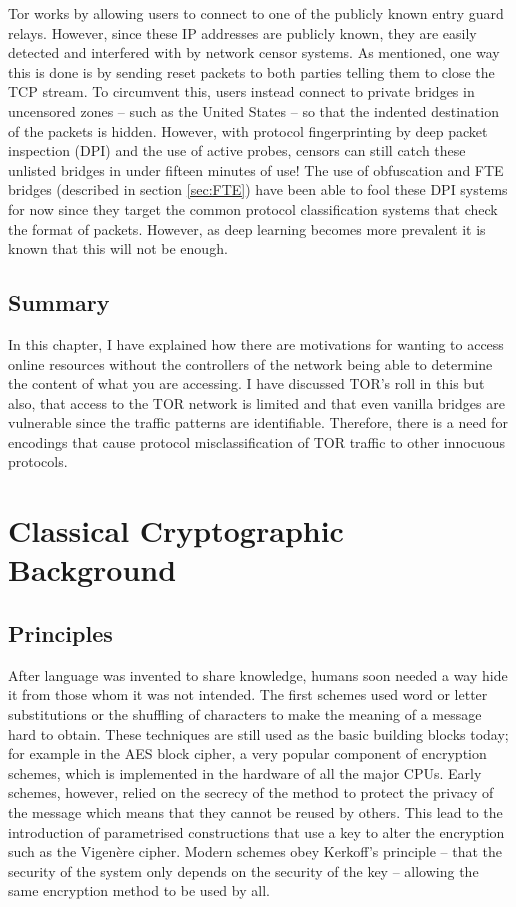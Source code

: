 \documentclass[ %
                    author={Samuel Russell},
                supervisor={Prof. Bogdan Warinschi},
                    degree={MEng},
                     title={Innocuous Ciphertexts},
                  subtitle={The DE-CENSOR Scheme},
                      type={Research},
                      year={2018} ]{dissertation}
\begin{document}
Tor works by allowing users to connect to one of the publicly known entry guard relays. However, since these IP addresses are publicly known, they are easily detected and interfered with by network censor systems. As mentioned, one way this is done is by sending reset packets to both parties telling them to close the TCP stream.
To circumvent this, users instead connect to private bridges in uncensored zones -- such as the United States -- so that the indented destination of the packets is hidden. However, with protocol fingerprinting by deep packet inspection (DPI) and the use of active probes, censors can still catch these unlisted bridges in under fifteen minutes of use!
The use of obfuscation and FTE bridges (described in section \ref{sec:FTE}) have been able to fool these DPI systems for now since they target the common protocol classification systems that check the format of packets. However, as deep learning becomes more prevalent it is known that this will not be enough.

\section{Summary}

In this chapter, I have explained how there are motivations for wanting to access online resources without the controllers of the network being able to determine the content of what you are accessing. I have discussed TOR's roll in this but also, that access to the TOR network is limited and that even vanilla bridges are vulnerable since the traffic patterns are identifiable. Therefore, there is a need for encodings that cause protocol misclassification of TOR traffic to other innocuous protocols.


\chapter{Classical Cryptographic Background}
\label{chap:technical}

\section{Principles}

After language was invented to share knowledge, humans soon needed a way hide it from those whom it was not intended. The first schemes used word or letter substitutions or the shuffling of characters to make the meaning of a message hard to obtain.
These techniques are still used as the basic building blocks today; for example in the AES block cipher, a very popular component of encryption schemes, which is implemented in the hardware of all the major CPUs.
Early schemes, however, relied on the secrecy of the method to protect the privacy of the message which means that they cannot be reused by others.
This lead to the introduction of parametrised constructions that use a key to alter the encryption such as the Vigen\`ere cipher.
Modern schemes obey Kerkoff's principle -- that the security of the system only depends on the security of the key -- allowing the same encryption method to be used by all.
\end{document}
